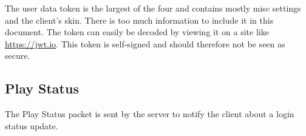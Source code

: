 The user data token is the largest of the four and contains mostly misc settings and the client's skin.
There is too much information to include it in this document. The token can easily be decoded by viewing it on a site like \url{https://jwt.io}.
This token is self-signed and should therefore not be seen as secure.

\subsection{Play Status}\label{subsec:play-status}

The Play Status packet is sent by the server to notify the client about a login status update.


